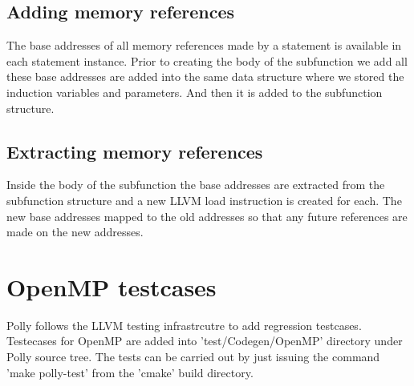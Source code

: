 \subsection{Adding memory references}

The base addresses of all memory references made by a statement is available in each statement instance. Prior to creating the body
of the subfunction we add all these base addresses are added into the same data structure where we stored the induction variables and parameters.
And then it is added to the subfunction structure.

\subsection{Extracting memory references}

Inside the body of the subfunction the base addresses are extracted from the subfunction structure and a new LLVM load instruction is created for each. The
new base addresses mapped to the old addresses so that any future references are made on the new addresses.

\section{OpenMP testcases}

Polly follows the LLVM testing infrastrcutre\cite{llvmtest} to add regression testcases. Testecases for OpenMP are added into
'test/Codegen/OpenMP' directory under Polly source tree. The tests can be carried out by just issuing the command 'make polly-test'
from the 'cmake' build directory.
